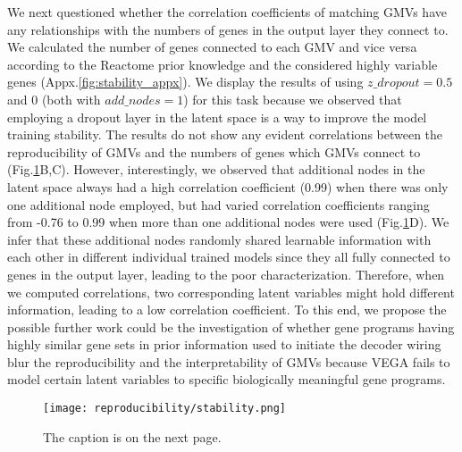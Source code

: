 We next questioned whether the correlation coefficients of matching GMVs have any relationships with the numbers of genes in the output layer they connect to. We calculated the number of genes connected to each GMV and vice versa according to the Reactome prior knowledge and the considered highly variable genes (Appx.\ref{fig:stability_appx}). We display the results of using $z\_dropout=0.5$ and 0 (both with $add\_nodes=1$) for this task because we observed that employing a dropout layer in the latent space is a way to improve the model training stability. The results do not show any evident correlations between the reproducibility of GMVs and the numbers of genes which GMVs connect to (Fig.\ref{fig:stability}B,C). However, interestingly, we observed that additional nodes in the latent space always had a high correlation coefficient (0.99) when there was only one additional node employed, but had varied correlation coefficients ranging from -0.76 to 0.99 when more than one additional nodes were used (Fig.\ref{fig:stability}D). We infer that these additional nodes randomly shared learnable information with each other in different individual trained models since they all fully connected to genes in the output layer, leading to the poor characterization. Therefore, when we computed correlations, two corresponding latent variables might hold different information, leading to a low correlation coefficient. To this end, we propose the possible further work could be the investigation of whether gene programs having highly similar gene sets in prior information used to initiate the decoder wiring blur the reproducibility and the interpretability of GMVs because VEGA fails to model certain latent variables to specific biologically meaningful gene programs.\vspace{17mm}

\begin{figure}[h!]
    \centering
    \texttt{[image: reproducibility/stability.png]}
    \caption{\small{The caption is on the next page.}}
    \label{fig:stability}
\end{figure}

\newpage

